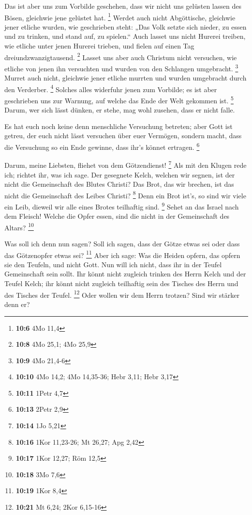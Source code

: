  Das ist aber uns zum Vorbilde geschehen, dass wir nicht
uns gelüsten lassen des Bösen, gleichwie jene gelüstet hat. \footnote{\textbf{10:6}
  4Mo 11,4}  Werdet auch nicht Abgöttische, gleichwie
jener etliche wurden, wie geschrieben steht: „Das Volk setzte sich
nieder, zu essen und zu trinken, und stand auf, zu spielen.``
 Auch lasset uns nicht Hurerei treiben, wie etliche unter
jenen Hurerei trieben, und fielen auf einen Tag dreiundzwanzigtausend.
\footnote{\textbf{10:8} 4Mo 25,1; 4Mo 25,9}  Lasset uns
aber auch Christum nicht versuchen, wie etliche von jenen ihn versuchten
und wurden von den Schlangen umgebracht. \footnote{\textbf{10:9} 4Mo
  21,4-6}  Murret auch nicht, gleichwie jener etliche
murrten und wurden umgebracht durch den Verderber. \footnote{\textbf{10:10}
  4Mo 14,2; 4Mo 14,35-36; Hebr 3,11; Hebr 3,17}  Solches
alles widerfuhr jenen zum Vorbilde; es ist aber geschrieben uns zur
Warnung, auf welche das Ende der Welt gekommen ist. \footnote{\textbf{10:11}
  1Petr 4,7}  Darum, wer sich lässt dünken, er stehe, mag
wohl zusehen, dass er nicht falle.

 Es hat euch noch keine denn menschliche Versuchung
betreten; aber Gott ist getreu, der euch nicht lässt versuchen über euer
Vermögen, sondern macht, dass die Versuchung so ein Ende gewinne, dass
ihr's könnet ertragen. \footnote{\textbf{10:13} 2Petr 2,9}

 Darum, meine Liebsten, fliehet von dem Götzendienst!
\footnote{\textbf{10:14} 1Jo 5,21}  Als mit den Klugen
rede ich; richtet ihr, was ich sage.  Der gesegnete
Kelch, welchen wir segnen, ist der nicht die Gemeinschaft des Blutes
Christi? Das Brot, das wir brechen, ist das nicht die Gemeinschaft des
Leibes Christi? \footnote{\textbf{10:16} 1Kor 11,23-26; Mt 26,27; Apg
  2,42}  Denn ein Brot ist's, so sind wir viele ein Leib,
dieweil wir alle eines Brotes teilhaftig sind. \footnote{\textbf{10:17}
  1Kor 12,27; Röm 12,5}  Sehet an das Israel nach dem
Fleisch! Welche die Opfer essen, sind die nicht in der Gemeinschaft des
Altars? \footnote{\textbf{10:18} 3Mo 7,6}

 Was soll ich denn nun sagen? Soll ich sagen, dass der
Götze etwas sei oder dass das Götzenopfer etwas sei? \footnote{\textbf{10:19}
  1Kor 8,4}  Aber ich sage: Was die Heiden opfern, das
opfern sie den Teufeln, und nicht Gott. Nun will ich nicht, dass ihr in
der Teufel Gemeinschaft sein sollt.  Ihr könnt nicht
zugleich trinken des Herrn Kelch und der Teufel Kelch; ihr könnt nicht
zugleich teilhaftig sein des Tisches des Herrn und des Tisches der
Teufel. \footnote{\textbf{10:21} Mt 6,24; 2Kor 6,15-16} 
Oder wollen wir dem Herrn trotzen? Sind wir stärker denn er?

